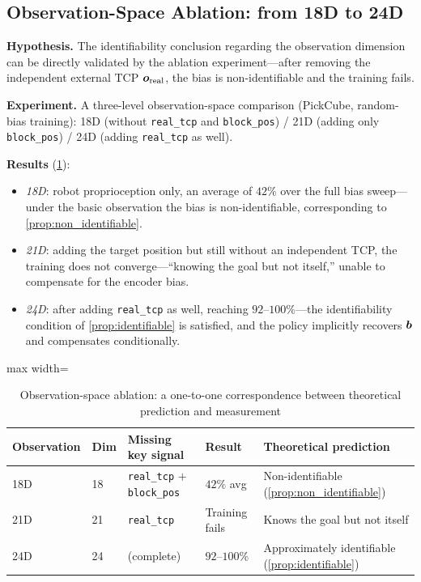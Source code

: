 \subsection{Observation-Space Ablation: from 18D to 24D}\label{sec:exp_ablation}

\textbf{Hypothesis.} The identifiability conclusion regarding the observation dimension can be directly validated by the ablation experiment---after removing the independent external TCP $\bm{o}_\text{real}$, the bias is non-identifiable and the training fails.

\textbf{Experiment.} A three-level observation-space comparison (PickCube, random-bias training): 18D (without \texttt{real\_tcp} and \texttt{block\_pos}) / 21D (adding only \texttt{block\_pos}) / 24D (adding \texttt{real\_tcp} as well).

\textbf{Results} (\cref{tab:ablation_obs}):
\begin{itemize}
  \item \emph{18D}: robot proprioception only, an average of $42\%$ over the full bias sweep---under the basic observation the bias is non-identifiable, corresponding to \cref{prop:non_identifiable}.
  \item \emph{21D}: adding the target position but still without an independent TCP, the training does not converge---``knowing the goal but not itself,'' unable to compensate for the encoder bias.
  \item \emph{24D}: after adding \texttt{real\_tcp} as well, reaching $92$--$100\%$---the identifiability condition of \cref{prop:identifiable} is satisfied, and the policy implicitly recovers $\bm{b}$ and compensates conditionally.
\end{itemize}

\begin{table}[htbp]
  \centering
  \caption{Observation-space ablation: a one-to-one correspondence between theoretical prediction and measurement}
  \label{tab:ablation_obs}
  \footnotesize
  \begin{adjustbox}{max width=\textwidth}
  \begin{tabular}{@{}lllll@{}}
    \toprule
    Observation & Dim & Missing key signal & Result & Theoretical prediction \\
    \midrule
    18D & 18 & \texttt{real\_tcp} $+$ \texttt{block\_pos} & $42\%$ avg & Non-identifiable (\cref{prop:non_identifiable}) \\
    21D & 21 & \texttt{real\_tcp} & Training fails & Knows the goal but not itself \\
    24D & 24 & (complete) & $92$--$100\%$ & Approximately identifiable (\cref{prop:identifiable}) \\
    \bottomrule
  \end{tabular}
  \end{adjustbox}
\end{table}

